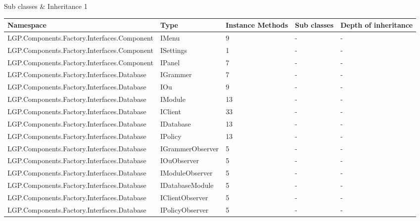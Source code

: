 \begin{table}[h!t]
				\caption{Sub classes \& Inheritance 1}			
				\label{tab:SubclassesInheritance1}
				
			\end{table}
			
		\newpage
			
			\begin{table}[h!t]
				\footnotesize{\begin{tabular}{ | p{65mm} | p{33mm} | p{10mm} | p{10mm} | p{10mm}  | }	
																								\hline
				Namespace & Type  & Instance Methods & Sub classes & Depth of inheritance  \\ \hline				
				LGP.Components.Factory.Interfaces.Component & IMenu & 9     & -     & -  \\ \hline
				LGP.Components.Factory.Interfaces.Component & ISettings & 1     & -     & -  \\ \hline
				LGP.Components.Factory.Interfaces.Component & IPanel & 7     & -     & -  \\ \hline
				LGP.Components.Factory.Interfaces.Database & IGrammer & 7     & -     & -  \\ \hline
				LGP.Components.Factory.Interfaces.Database & IOu   & 9     & -     & -  \\ \hline
				LGP.Components.Factory.Interfaces.Database & IModule & 13    & -     & -  \\ \hline
				LGP.Components.Factory.Interfaces.Database & IClient & \cellcolor{ored}33    & -     & -  \\ \hline
				LGP.Components.Factory.Interfaces.Database & IDatabase & 13    & -     & -  \\ \hline
				LGP.Components.Factory.Interfaces.Database & IPolicy & 13    & -     & -  \\ \hline
				LGP.Components.Factory.Interfaces.Database & IGrammerObserver & 5     & -     & -  \\ \hline
				LGP.Components.Factory.Interfaces.Database & IOuObserver & 5     & -     & -  \\ \hline
				LGP.Components.Factory.Interfaces.Database & IModuleObserver & 5     & -     & -  \\ \hline
				LGP.Components.Factory.Interfaces.Database & IDatabaseModule & 5     & -     & -  \\ \hline
				LGP.Components.Factory.Interfaces.Database & IClientObserver & 5     & -     & -  \\ \hline
				LGP.Components.Factory.Interfaces.Database & IPolicyObserver & 5     & -     & -  \\ \hline

\end{tabular}}
\end{table}
